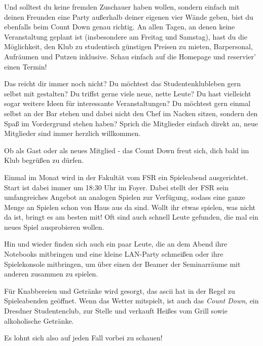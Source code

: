 Und solltest du keine fremden Zuschauer haben wollen, sondern einfach mit deinen Freunden eine Party außerhalb deiner eigenen vier Wände geben, bist du ebenfalls beim Count Down genau richtig.
An allen Tagen, an denen keine Veranstaltung geplant ist (insbesondere am Freitag und Samstag), hast du die Möglichkeit, den Klub zu studentisch günstigen Preisen zu mieten, Barpersonal, Aufräumen und Putzen inklusive.
Schau einfach auf die Homepage und reservier' einen Termin!

Das reicht dir immer noch nicht?
Du möchtest das Studentenklubleben gern selbst mit gestalten?
Du triffst gerne viele neue, nette Leute?
Du hast vielleicht sogar weitere Ideen für interessante Veranstaltungen?
Du möchtest gern einmal selbst an der Bar stehen und dabei nicht den Chef im Nacken sitzen, sondern den Spaß im Vordergrund stehen haben?
Sprich die Mitglieder einfach direkt an, neue Mitglieder sind immer herzlich willkommen.

Ob als Gast oder als neues Mitglied - das Count Down freut sich, dich bald im Klub begrüßen zu dürfen.


Einmal im Monat wird in der Fakultät vom FSR ein Spieleabend ausgerichtet. Start ist dabei immer um 18:30 Uhr im Foyer. Dabei stellt der FSR sein umfangreiches Angebot an analogen Spielen zur Verfügung, sodass eine ganze Menge an Spielen schon von Haus aus da sind. Wollt ihr etwas spielen, was nicht da ist, bringt es am besten mit! Oft sind auch schnell Leute gefunden, die mal ein neues Spiel ausprobieren wollen.

Hin und wieder finden sich auch ein paar Leute, die an dem Abend ihre Notebooks mitbringen und eine kleine LAN-Party schmeißen oder ihre Spielekonsole mitbringen, um über einen der Beamer der Seminarräume mit anderen zusammen zu spielen.

Für Knabbereien und Getränke wird gesorgt, das ascii hat in der Regel zu Spieleabenden geöffnet. Wenn das Wetter mitspielt, ist auch das \emph{Count Down}, ein Dresdner Studentenclub, zur Stelle und verkauft Heißes vom Grill sowie alkoholische Getränke.

Es lohnt sich also auf jeden Fall vorbei zu schauen!

\pagebreak

\
\thispagestyle{empty}
